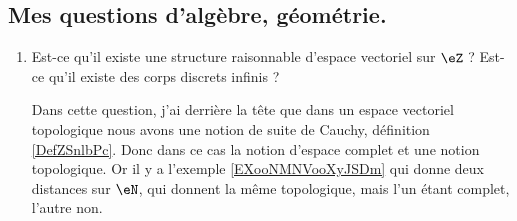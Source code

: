 \subsection{Mes questions d'algèbre, géométrie.}

\begin{enumerate}
    \item
        Est-ce qu'il existe une structure raisonnable d'espace vectoriel sur \( \eZ\) ? Est-ce qu'il existe des corps discrets infinis ? 

        Dans cette question, j'ai derrière la tête que dans un espace vectoriel topologique nous avons une notion de suite de Cauchy, définition \ref{DefZSnlbPc}. Donc dans ce cas la notion d'espace complet et une notion topologique. Or il y a l'exemple \ref{EXooNMNVooXyJSDm} qui donne deux distances sur \( \eN\), qui donnent la même topologique, mais l'un étant complet, l'autre non.


\end{enumerate}
